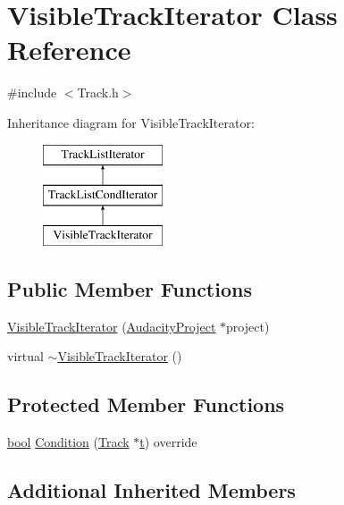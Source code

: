 \hypertarget{class_visible_track_iterator}{}\section{Visible\+Track\+Iterator Class Reference}
\label{class_visible_track_iterator}


{\ttfamily \#include $<$Track.\+h$>$}

Inheritance diagram for Visible\+Track\+Iterator\+:\begin{figure}[H]
\begin{center}
\leavevmode
\includegraphics[height=3.000000cm]{class_visible_track_iterator}
\end{center}
\end{figure}
\subsection*{Public Member Functions}
\begin{DoxyCompactItemize}
\item 
\hyperlink{class_visible_track_iterator_aabf991905ca308ed58ae83b12c5d7638}{Visible\+Track\+Iterator} (\hyperlink{class_audacity_project}{Audacity\+Project} $\ast$project)
\item 
virtual \hyperlink{class_visible_track_iterator_abdaae0cfd440b7445bb74fbb3a42b6c4}{$\sim$\+Visible\+Track\+Iterator} ()
\end{DoxyCompactItemize}
\subsection*{Protected Member Functions}
\begin{DoxyCompactItemize}
\item 
\hyperlink{mac_2config_2i386_2lib-src_2libsoxr_2soxr-config_8h_abb452686968e48b67397da5f97445f5b}{bool} \hyperlink{class_visible_track_iterator_a4c99d48b35e8449ad6b2b44bd7a7ab1e}{Condition} (\hyperlink{class_track}{Track} $\ast$\hyperlink{octave__test_8m_aaccc9105df5383111407fd5b41255e23}{t}) override
\end{DoxyCompactItemize}
\subsection*{Additional Inherited Members}


